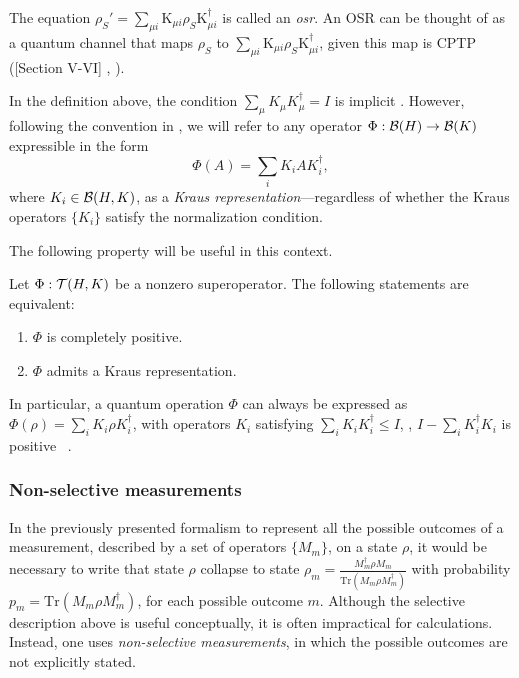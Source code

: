 \begin{definition}
  The equation $ \rho_{S}' = \sum_{\mu i} \text{K}_{\mu i} \rho_{S} \text{K}_{\mu i}^{\dag} $ is called an \emph{\acrfull{osr}}. An OSR can be thought of as a quantum channel that maps $\rho_{S}$ to $\sum_{\mu i} \text{K}_{\mu i} \rho_{S} \text{K}_{\mu i}^{\dag}$, given this map is CPTP ([Section V-VI] \cite{lidar2019lecture}, \cite[Chapter 8.2.3]{nielsen2010quantum}). 
\end{definition}


In the definition above, the condition $\sum_{\mu} K_{\mu} K_{\mu}^{\dag} = I$ is implicit \cite{lidar2019lecture,nielsen2010quantum}. However, following the convention in \cite{watrous2018theory}, we will refer to any operator $\Phi: \mathcal{B}(H) \to \mathcal{B}(K)$ expressible in the form  
\[
\Phi(A) = \sum_i K_i A K_i^\dag,  
\]  
where $K_i \in \mathcal{B}(H,K)$, as a \emph{Kraus representation}---regardless of whether the Kraus operators $\{K_i\}$ satisfy the normalization condition. 

The following property will be useful in this context.

\begin{theorem} \cite[Theorem 2.22 ]{watrous2018theory} \label{thm:cp_kraus}
  Let $\Phi:\mathcal{T}(H,K)$ be a nonzero superoperator. The following statements are equivalent:
  \begin{enumerate}
    \item  $\Phi$ is completely positive.
    \item  $\Phi$ admits a Kraus representation.
  \end{enumerate}
\end{theorem}

In particular, a quantum operation $\Phi$ can always be expressed as $\Phi(\rho) = \sum_i K_i \rho K_i^\dag$,  with operators $K_i$ satisfying $\sum_i K_i K_i^\dag \leq I$, \ie, $I - \sum_i K_i^\dagger K_i$ is positive ~\cite[Theorem~8.1]{nielsen2010quantum}.






\subsubsection{Non-selective measurements}

In the previously presented formalism to represent all the possible outcomes of a measurement, described by a set of operators $\{M_{m}\}$, on a state $\rho$, it would be necessary to write that state $\rho$ collapse to state $\rho_m=\frac{M_{m}^{\dag}\rho M_{m}}{\text{Tr}(M_{m}\rho M_{m}^{\dag})}$ with probability $p_m=\text{Tr}(M_{m}\rho M_{m}^{\dag})$, for each possible outcome $m$. Although the selective description above is useful conceptually, it is often impractical for calculations. Instead, one uses \emph{non-selective measurements}, in which the possible outcomes are not explicitly stated.


